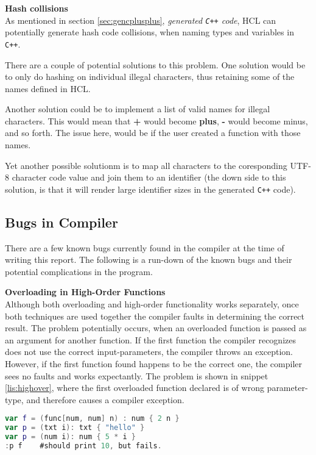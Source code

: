\textbf{Hash collisions}\\
As mentioned in section \ref{sec:gencplusplus}, \textit{generated \texttt{C++} code}, HCL can potentially generate hash code collisions, when naming types and variables in \texttt{C++}.

There are a couple of potential solutions to this problem.
One solution would be to only do hashing on individual illegal characters, thus retaining some of the names defined in HCL.

Another solution could be to implement a list of valid names for illegal characters.
This would mean that \textbf{+} would become \textbf{plus}, \textbf{-} would become minus, and so forth.
The issue here, would be if the user created a function with those names.

Yet another possible solutionm is to map all characters to the coresponding UTF-8 character code value and join them to an identifier (the down side to this solution, is that it will render large identifier sizes in the generated \texttt{C++} code).

\subsection{Bugs in Compiler}
There are a few known bugs currently found in the compiler at the time of writing this report. 
The following is a run-down of the known bugs and their potential complications in the program. 

\textbf{Overloading in High-Order Functions}\\
Although both overloading and high-order functionality works separately, once both techniques are used together the compiler faults in determining the correct result.
The problem potentially occurs, when an overloaded function is passed as an argument for another function. 
If the first function the compiler recognizes does not use the correct input-parameters, the compiler throws an exception.
However, if the first function found happens to be the correct one, the compiler sees no faults and works expectantly.
The problem is shown in snippet \ref{lis:highover}, where the first overloaded function declared is of wrong parameter-type, and therefore causes a compiler exception. 
\begin{lstlisting}[language=Kotlin,label=lis:highover,caption=Overloading in high-order functions problem.]
var f = (func[num, num] n) : num { 2 n }
var p = (txt i): txt { "hello" }
var p = (num i): num { 5 * i }
:p f 	#should print 10, but fails. 
\end{lstlisting}


